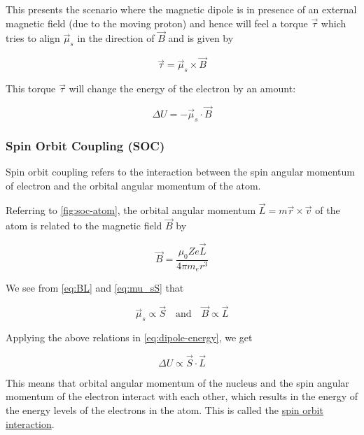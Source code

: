 This presents the scenario where the magnetic dipole is in presence of an external magnetic field (due to the moving proton) and hence will feel a torque \( \vec{\tau} \) which tries to align \( \vec{\mu}_s \) in the direction of \( \vec{B} \) and is given by

\begin{equation}
    \vec{\tau} = \vec{\mu}_s \times \vec{B}
\end{equation}

This torque \( \vec{\tau} \) will change the energy of the electron by an amount:

\begin{equation} \label{eq:dipole-energy}
    \Delta U = - \vec{\mu}_s \cdot \vec{B}
\end{equation}


\subsubsection{Spin Orbit Coupling (SOC)}

Spin orbit coupling refers to the interaction between the spin angular momentum of electron and the orbital angular momentum of the atom.

Referring to \cref{fig:soc-atom}, the orbital angular momentum \( \vec{L} = m \vec{r} \times \vec{v} \) of the atom is related to the magnetic field \( \vec{B} \) by

\begin{equation} \label{eq:BL}
    \vec{B} = \frac{\mu_0 Z e \vec{L}}{4 \pi m_e r^3}
\end{equation}

We see from \cref{eq:BL} and \cref{eq:mu_sS} that

\begin{equation*}
    \vec{\mu}_s \propto \vec{S} \quad \text{and} \quad \vec{B} \propto \vec{L}
\end{equation*}

Applying the above relations in \cref{eq:dipole-energy}, we get

\begin{equation}
    \Delta U \propto \vec{S} \cdot \vec{L}
\end{equation}

This means that orbital angular momentum of the nucleus and the spin angular momentum of the electron interact with each other, which results in the energy of the energy levels of the electrons in the atom.
This is called the \underline{spin orbit interaction}.

